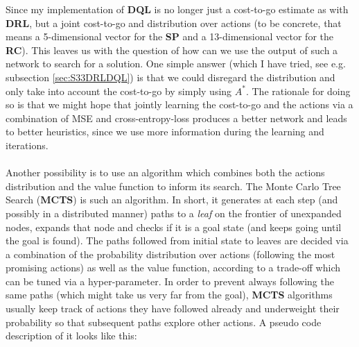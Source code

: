 Since my implementation of \textbf{DQL} is no longer just a cost-to-go estimate as with \textbf{DRL}, but a joint cost-to-go and distribution over actions (to be concrete, that means a 5-dimensional vector for the \textbf{SP} and a 13-dimensional vector for the \textbf{RC}). This leaves us with the question of how can we use the output of such a network to search for a solution. One simple answer (which I have tried, see e.g. subsection \ref{sec:S33DRLDQL}) is that we could disregard the distribution and only take into account the cost-to-go by simply using $A^{*}$. The rationale for doing so is that we might hope that jointly learning the cost-to-go and the actions via a combination of MSE and cross-entropy-loss produces a better network and leads to better heuristics, since we use more information during the learning and iterations.
\\
\\
Another possibility is to use an algorithm which combines both the actions distribution and the value function to inform its search. The Monte Carlo Tree Search (\textbf{MCTS}) is such an algorithm. In short, it generates at each step (and possibly in a distributed manner) paths to a \textit{leaf} on the frontier of unexpanded nodes, expands that node and checks if it is a goal state (and keeps going until the goal is found). The paths followed from initial state to leaves are decided via a combination of the probability distribution over actions (following the most promising actions) as well as the value function, according to a trade-off which can be tuned via a hyper-parameter. In order to prevent always following the same paths (which might take us very far from the goal), \textbf{MCTS} algorithms usually keep track of actions they have followed already and underweight their probability so that subsequent paths explore other actions. A pseudo code description of it looks like this:
\\
\teal

